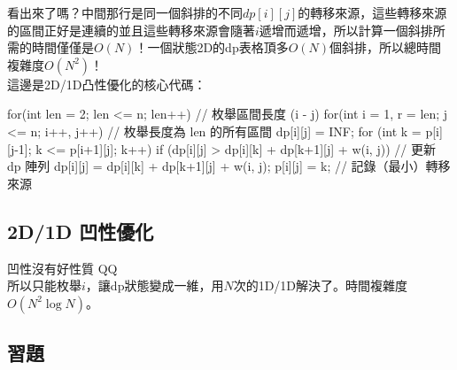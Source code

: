 \documentclass[main.tex]{subfiles}
\begin{document}
	看出來了嗎？中間那行是同一個斜排的不同$dp[i][j]$的轉移來源，這些轉移來源的區間正好是連續的並且這些轉移來源會隨著$i$遞增而遞增，所以計算一個斜排所需的時間僅僅是$O(N)$！一個狀態2D的dp表格頂多$O(N)$個斜排，所以總時間複雜度$O(N^2)$！\\
	
	這邊是2D/1D凸性優化的核心代碼：\\
	
	\begin{C++}
		for(int len = 2; len <= n; len++){  // 枚舉區間長度 (i - j)
			for(int i = 1, r = len; j <= n; i++, j++){
				// 枚舉長度為 len 的所有區間
				dp[i][j] = INF;
				for (int k = p[i][j-1]; k <= p[i+1][j]; k++)
				if (dp[i][j] > dp[i][k] + dp[k+1][j] + w(i, j)){
					// 更新 dp 陣列
					dp[i][j] = dp[i][k] + dp[k+1][j] + w(i, j);
					p[i][j] = k;  // 記錄（最小）轉移來源
				}
			}
		}
	\end{C++}
	
	\subsection{2D/1D 凹性優化}
	
	凹性沒有好性質 QQ\\
	
	所以只能枚舉$i$，讓dp狀態變成一維，用$N$次的1D/1D解決了。時間複雜度$O(N^2\log N)$。
	
	\subsection{習題}
		
			

	
\end{document}
